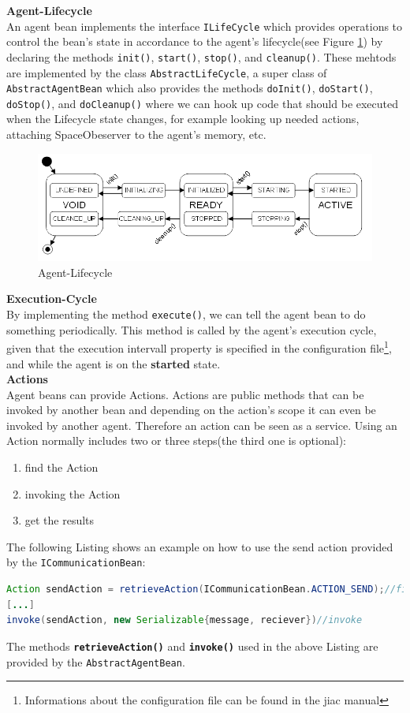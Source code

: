 \textbf{Agent-Lifecycle}\\
An agent bean implements the interface \texttt{ILifeCycle} which provides operations to control the bean's state in accordance to the agent's lifecycle(see Figure \ref{fig:lifecycle}) by declaring the methods \texttt{init()}, \texttt{start()}, \texttt{stop()}, and \texttt{cleanup()}. These mehtods are implemented by the class \texttt{AbstractLifeCycle}, a super class of \texttt{AbstractAgentBean} which also provides the methods \texttt{doInit()}, \texttt{doStart()}, \texttt{doStop()}, and \texttt{doCleanup()} where we can hook up code that should be executed when the Lifecycle state changes, for example looking up needed actions, attaching SpaceObeserver to the agent's memory, etc.
\begin{figure}
	\centering
		\includegraphics[width=1.00\textwidth]{images/lifecycle.png}
		\caption{Agent-Lifecycle \cite{JIACMAN10}}
		\label{fig:lifecycle}
\end{figure}

\textbf{Execution-Cycle}\\
By implementing the method \texttt{execute()}, we can tell the agent bean to do something periodically. This method is called by the agent's execution cycle, given that the execution intervall property is specified in the configuration file\footnote{Informations about the configuration file can be found in the jiac manual\cite{JIACMAN10}}, and while the agent is on the \textbf{started} state.\\

\textbf{Actions}\\
Agent beans can provide Actions. Actions are public methods that can be invoked by another bean and depending on the action's scope it can even be invoked by another agent. Therefore an action can be seen as a service. 
Using an Action normally includes two or three steps(the third one is optional):
\begin{enumerate}
	\item find the Action
	\item invoking the Action
	\item get the results
\end{enumerate}
The following Listing shows an example on how to use the send action provided by the \texttt{ICommunicationBean}:
\begin{lstlisting}[language = Java, caption = Using an Action]
Action sendAction = retrieveAction(ICommunicationBean.ACTION_SEND);//find action
[...]
invoke(sendAction, new Serializable{message, reciever})//invoke
\end{lstlisting}
The methods \textbf{\texttt{retrieveAction()}} and \textbf{\texttt{invoke()}} used in the above Listing are provided  by the \texttt{AbstractAgentBean}.\\

